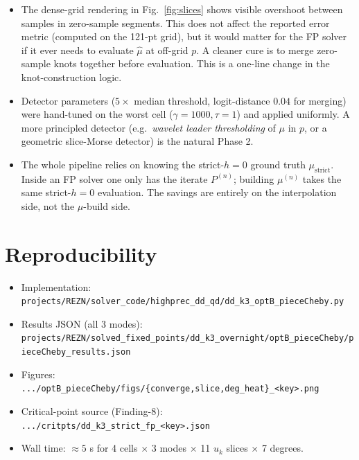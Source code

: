 \documentclass[11pt,a4paper]{article}
\begin{document}
\begin{itemize}
\item The dense-grid rendering in Fig.~\ref{fig:slices} shows visible
  overshoot between samples in zero-sample segments. This does not affect
  the reported error metric (computed on the 121-pt grid), but it would
  matter for the FP solver if it ever needs to evaluate $\hat\mu$ at
  off-grid $p$. A cleaner cure is to merge zero-sample knots together
  before evaluation. This is a one-line change in the knot-construction
  logic.
\item Detector parameters ($5\times$ median threshold, logit-distance
  $0.04$ for merging) were hand-tuned on the worst cell
  ($\gamma{=}1000,\tau{=}1$) and applied uniformly. A more principled
  detector (e.g.\ \emph{wavelet leader thresholding} of $\mu$ in $p$, or a
  geometric slice-Morse detector) is the natural Phase 2.
\item The whole pipeline relies on knowing the strict-$h{=}0$ ground
  truth $\mu_\mathrm{strict}$. Inside an FP solver one only has the
  iterate $P^{(n)}$; building $\mu^{(n)}$ takes the same strict-$h{=}0$
  evaluation. The savings are entirely on the interpolation side, not the
  $\mu$-build side.
\end{itemize}

\section{Reproducibility}

\begin{itemize}
\item Implementation: \texttt{projects/REZN/solver\_code/highprec\_dd\_qd/dd\_k3\_optB\_pieceCheby.py}
\item Results JSON (all 3 modes): \texttt{projects/REZN/solved\_fixed\_points/dd\_k3\_overnight/optB\_pieceCheby/pieceCheby\_results.json}
\item Figures: \texttt{.../optB\_pieceCheby/figs/\{converge,slice,deg\_heat\}\_<key>.png}
\item Critical-point source (Finding-8): \texttt{.../critpts/dd\_k3\_strict\_fp\_<key>.json}
\item Wall time: $\approx 5$ s for 4 cells $\times$ 3 modes $\times$ 11
  $u_k$ slices $\times$ 7 degrees.
\end{itemize}
\end{document}
